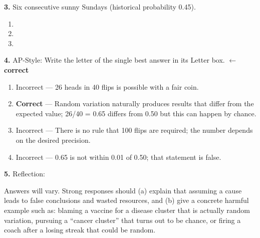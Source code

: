 \documentclass[10pt]{article}
\begin{document}
\begin{practicebox}
\vspace{6pt}
\textbf{3.} Six consecutive sunny Sundays (historical probability 0.45).
\begin{enumerate}[label=(\alph*), leftmargin=2em, itemsep=5pt]
  \item {}
\tcbbreak
  \item {}\gradedkey{\gradedblank[id=hw3b, type=short, points=2, answer=0.0083, check=numeric, tolerance=0.0003]{0.9in}{0.24in}}
  \item {}
\end{enumerate}

\vspace{6pt}
\textbf{4.} AP-Style: Write the letter of the single best answer in its Letter box.  \textcolor{keyred}{\textbf{$\leftarrow$ correct}}
\begin{enumerate}[label=(\Alph*), leftmargin=2em, itemsep=2pt]
  \item Incorrect --- 26 heads in 40 flips is possible with a fair coin.
  \item \textbf{Correct} --- Random variation naturally produces results that differ from the expected value; 26/40 = 0.65 differs from 0.50 but this can happen by chance.
  \item Incorrect --- There is no rule that 100 flips are required; the number depends on the desired precision.
  \item Incorrect --- 0.65 is not within 0.01 of 0.50; that statement is false.
\end{enumerate}

\vspace{6pt}
\textbf{5.} Reflection:
\begin{teachernote}
Answers will vary. Strong responses should (a) explain that assuming a cause leads to false conclusions and wasted resources, and (b) give a concrete harmful example such as: blaming a vaccine for a disease cluster that is actually random variation, pursuing a ``cancer cluster'' that turns out to be chance, or firing a coach after a losing streak that could be random.
\end{teachernote}


\end{practicebox}
\end{document}

